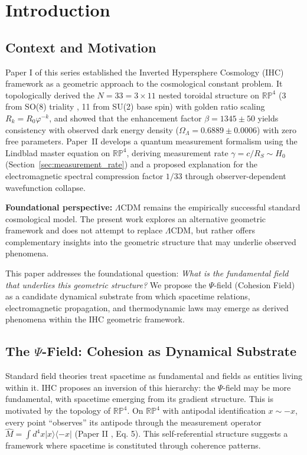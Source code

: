 
\section{Introduction}

\subsection{Context and Motivation}

Paper I of this series \citep{Peacock2026a} established the Inverted Hypersphere Cosmology (IHC) framework as a geometric approach to the cosmological constant problem. It topologically derived the $N = 33 = 3 \times 11$ nested toroidal structure on $\mathbb{RP}^4$ (3 from SO(8) triality \citep{Cartan1925}, 11 from SU(2) base spin) with golden ratio scaling $R_k = R_0\varphi^{-k}$, and showed that the enhancement factor $\beta = 1345 \pm 50$ yields consistency with observed dark energy density ($\Omega_\Lambda = 0.6889 \pm 0.0006$) with zero free parameters. Paper~II \citep{Peacock2026b_qm} develops a quantum measurement formalism using the Lindblad master equation on $\mathbb{RP}^4$, deriving measurement rate $\gamma = c/R_S \sim H_0$ (Section~\ref{sec:measurement_rate}) and a proposed explanation for the electromagnetic spectral compression factor $1/33$ through observer-dependent wavefunction collapse.

\textbf{Foundational perspective:} $\Lambda$CDM remains the empirically successful standard cosmological model. The present work explores an alternative geometric framework and does not attempt to replace $\Lambda$CDM, but rather offers complementary insights into the geometric structure that may underlie observed phenomena.

This paper addresses the foundational question: \textit{What is the fundamental field that underlies this geometric structure?} We propose the $\Psi$-field (Cohesion Field) as a candidate dynamical substrate from which spacetime relations, electromagnetic propagation, and thermodynamic laws may emerge as derived phenomena within the IHC geometric framework.

\subsection{The $\Psi$-Field: Cohesion as Dynamical Substrate}

Standard field theories treat spacetime as fundamental and fields as entities living within it. IHC proposes an inversion of this hierarchy: the $\Psi$-field may be more fundamental, with spacetime emerging from its gradient structure. This is motivated by the topology of $\mathbb{RP}^4$. On $\mathbb{RP}^4$ with antipodal identification $x \sim -x$, every point ``observes'' its antipode through the measurement operator $\hat{M} = \int d^4x |x\rangle\langle -x|$ (Paper II \citep{Peacock2026b_qm}, Eq. 5). This self-referential structure suggests a framework where spacetime is constituted through coherence patterns.

